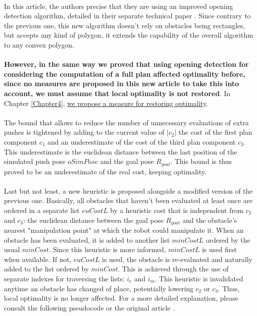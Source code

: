 \paragraph{} In this article, the authors precise that they are using an improved opening detection algorithm, detailed in their separate technical paper \parencite{levihn_efficient_2011}. Since contrary to the previous one, this new algorithm doesn't rely on obstacles being rectangles, but accepts any kind of polygon, it extends the capability of the overall algorithm to any convex polygon.

\paragraph{} \textbf{However, in the same way we proved that using opening detection for considering the computation of a full plan affected optimality before, since no measures are proposed in this new article to take this into account, we must assume that local optimality is not restored}. In Chapter \ref{Chapter4}, \hyperref[check_opening_solution]{we propose a measure for restoring optimality}.

\paragraph{} The bound that allows to reduce the number of unnecessary evaluations of extra pushes is tightened by adding to the current value of $|c_{2}|$ the cost of the first plan component $c_{1}$ and an underestimate of the cost of the third plan component $c_{3}$. This underestimate is the euclidean distance between the last position of the simulated push pose $oSimPose$ and the goal pose $R_{goal}$. This bound is thus proved to be an underestimate of the real cost, keeping optimality.

\paragraph{} Last but not least, a new heuristic is proposed alongside a modified version of the previous one. Basically, all obstacles that haven't been evaluated at least once are ordered in a separate list $euCostL$ by a heuristic cost that is independent from $c_{2}$ and $c_{3}$: the euclidean distance between the goal pose $R_{goal}$ and the obstacle's nearest "manipulation point" at which the robot could manipulate it. When an obstacle has been evaluated, it is added to another list $minCostL$ ordered by the usual $minCost$. Since this heuristic is more informed, $minCostL$ is used first when available. If not, $euCostL$ is used, the obstacle is re-evaluated and naturally added to the list ordered by $minCost$. This is achieved through the use of separate indexes for traversing the lists: $i_{e}$ and $i_{m}$. This heuristic is invalidated anytime an obstacle has changed of place, potentially lowering $c_{2}$ or $c_{3}$. Thus, local optimality is no longer affected. For a more detailed explanation, please consult the following pseudocode or the original article \parencite{levihn_locally_2014}.

